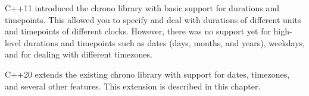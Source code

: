 C++11 introduced the chrono library with basic support for durations and timepoints. This allowed you to specify and deal with durations of different units and timepoints of different clocks. However, there was no support yet for high-level durations and timepoints such as dates (days, months, and years), weekdays, and for dealing with different timezones.

C++20 extends the existing chrono library with support for dates, timezones, and several other features. This extension is described in this chapter.
